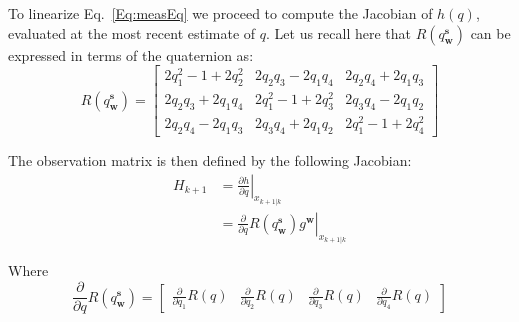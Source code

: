 \documentclass[a4paper,10pt]{article}
\DeclareMathOperator{\sensor}{\mathbf{s}}
\DeclareMathOperator{\world}{\mathbf{w}}
\begin{document}
  To linearize Eq.~\ref{Eq:measEq} we proceed to compute the Jacobian of $h(q)$, evaluated at the most recent estimate of $q$. Let us recall here that $R(q^{\sensor}_{\world})$ can be expressed in terms of the quaternion as:
  \begin{equation}
   R(q^{\sensor}_{\world}) = \left[\begin{array}{ccc}
               2q^2_1-1+2q^2_2 & 2q_2q_3 - 2q_1q_4 & 2q_2q_4 + 2q_1q_3 \\
               2q_2q_3+2q_1q_4 & 2q^2_1-1+2q^2_3 & 2q_3q_4-2q_1q_2 \\
               2q_2q_4-2q_1q_3 & 2q_3q_4+2q_1q_2 & 2q^2_1-1+2q^2_4
              \end{array}\right]
  \end{equation}

  The observation matrix is then defined by the following Jacobian:
  \begin{align}
   H_{k+1} &= \left.\frac{\partial h}{\partial q} \right|_{x_{k+1|k}} \\
           &= \left.\frac{\partial}{\partial q} R(q^{\sensor}_{\world}) g^{\world}\right|_{x_{k+1|k}}
  \end{align}

  Where
  \begin{equation}
  \frac{\partial}{\partial q} R(q^{\sensor}_{\world}) =\left[\begin{array}{cccc}
                                                \frac{\partial}{\partial q_1} R(q) & \frac{\partial}{\partial q_2} R(q) & \frac{\partial}{\partial q_3} R(q) & \frac{\partial}{\partial q_4} R(q)
                                               \end{array}\right]
  \end{equation}
\end{document}
